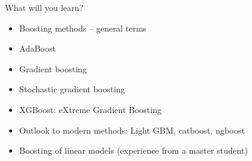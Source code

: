 \documentclass[
  10pt,
  ignorenonframetext,
]{beamer}
\providecommand{\tightlist}{%
  \setlength{\itemsep}{0pt}\setlength{\parskip}{0pt}}
\begin{document}
\begin{frame}
\begin{block}{What will you learn?}
\protect\hypertarget{what-will-you-learn}{}
\(~\)

\begin{itemize}
\tightlist
\item
  Boosting methods -- general terms
\end{itemize}

\vspace{2mm}

\begin{itemize}
\tightlist
\item
  AdaBoost
\end{itemize}

\vspace{2mm}

\begin{itemize}
\tightlist
\item
  Gradient boosting
\end{itemize}

\vspace{2mm}

\begin{itemize}
\tightlist
\item
  Stochastic gradient boosting
\end{itemize}

\vspace{2mm}

\begin{itemize}
\tightlist
\item
  XGBoost: eXtreme Gradient Boosting
\end{itemize}

\vspace{2mm}

\begin{itemize}
\tightlist
\item
  Outlook to modern methods: Light GBM, catboost, ngboost
\end{itemize}

\vspace{2mm}

\begin{itemize}
\tightlist
\item
  Boosting of linear models (experience from a master student)
\end{itemize}
\end{block}
\end{frame}
\end{document}
